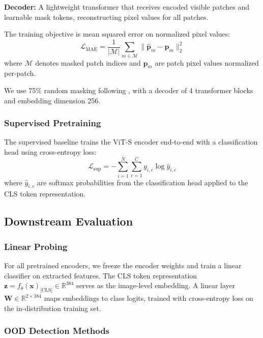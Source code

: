 \documentclass[11pt,a4paper]{article}
\begin{document}
\textbf{Decoder:} A lightweight transformer that receives encoded visible patches and learnable mask tokens, reconstructing pixel values for all patches.

The training objective is mean squared error on normalized pixel values:
\begin{equation}
    \mathcal{L}_{\text{MAE}} = \frac{1}{|\mathcal{M}|} \sum_{m \in \mathcal{M}} \|\hat{\mathbf{p}}_m - \mathbf{p}_m\|_2^2
\end{equation}
where $\mathcal{M}$ denotes masked patch indices and $\mathbf{p}_m$ are patch pixel values normalized per-patch.

We use 75\% random masking following \citet{he2022masked}, with a decoder of 4 transformer blocks and embedding dimension 256.

\subsubsection{Supervised Pretraining}

The supervised baseline trains the ViT-S encoder end-to-end with a classification head using cross-entropy loss:
\begin{equation}
    \mathcal{L}_{\text{sup}} = -\sum_{i=1}^{N} \sum_{c=1}^{C} y_{i,c} \log \hat{y}_{i,c}
\end{equation}
where $\hat{y}_{i,c}$ are softmax probabilities from the classification head applied to the CLS token representation.

\subsection{Downstream Evaluation}

\subsubsection{Linear Probing}

For all pretrained encoders, we freeze the encoder weights and train a linear classifier on extracted features. The CLS token representation $\mathbf{z} = f_\theta(\mathbf{x})_{\text{[CLS]}} \in \mathbb{R}^{384}$ serves as the image-level embedding. A linear layer $\mathbf{W} \in \mathbb{R}^{2 \times 384}$ maps embeddings to class logits, trained with cross-entropy loss on the in-distribution training set.

\subsubsection{OOD Detection Methods}
\end{document}

